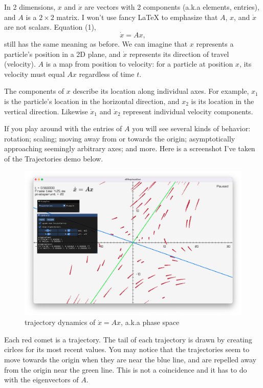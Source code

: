 \documentclass[11pt, oneside]{article}   	%
\begin{document}
In 2 dimensions, $x$ and $\dot{x}$ are vectors with 2 components (a.k.a elements, entries), and $A$ is a $2\times 2$ matrix.
I won't use fancy LaTeX to emphasize that $A$, $x$, and $\dot{x}$ are not scalars.
Equation (1),
$$ \dot{x} = Ax ,$$
still has the same meaning as before.
We can imagine that $x$ represents a particle's position in a 2D plane,
and $\dot{x}$ represents its direction of travel (velocity).
$A$ is a map from position to velocity: for a particle at position $x$, its velocity must equal $Ax$ regardless of time $t$.

The components of $x$ describe its location along individual axes.
For example, $x_1$ is the particle's location in the horizontal direction,
and $x_2$ is its location in the vertical direction.
Likewise $\dot{x}_1$ and $\dot{x}_2$ represent individual velocity components.

If you play around with the entries of $A$ you will see several kinds of behavior:
rotation;
scaling;
moving away from or towards the origin;
asymptotically approaching seemingly arbitrary axes;
and more.
Here is a screenshot I've taken of the Trajectories demo below.

\graphicspath{ {./assets/} }
\begin{figure}[h]
\includegraphics[scale=0.31]{screenshot_trajectories}
\caption{trajectory dynamics of $\dot{x} = Ax$, a.k.a phase space}
\end{figure}

Each red comet is a trajectory.
The tail of each trajectory is drawn by creating cirlces for its most recent values.
You may notice that the trajectories seem to move towards the origin when they are near the blue line,
and are repelled away from the origin near the green line.
This is not a coincidence and it has to do with the eigenvectors of $A$.
\end{document}
